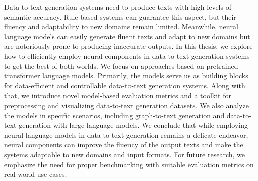 

Data-to-text generation systems need to produce texts with high levels of semantic accuracy. Rule-based systems can guarantee this aspect, but their fluency and adaptability to new domains remain limited. Meanwhile, neural language models can easily generate fluent texts and adapt to new domains but are notoriously prone to producing inaccurate outputs. In this thesis, we explore how to efficiently employ neural components in data-to-text generation systems to get the best of both worlds. We focus on approaches based on pretrained transformer language models. Primarily, the models serve us as building blocks for data-efficient and controllable data-to-text generation systems. Along with that, we introduce novel model-based evaluation metrics and a toolkit for preprocessing and visualizing data-to-text generation datasets. We also analyze the models in specific scenarios, including graph-to-text generation and data-to-text generation with large language models. We conclude that while employing neural language models in data-to-text generation remains a delicate endeavor, neural components can improve the fluency of the output texts and make the systems adaptable to new domains and input formats. For future research, we emphasize the need for proper benchmarking with suitable evaluation metrics on real-world use cases.